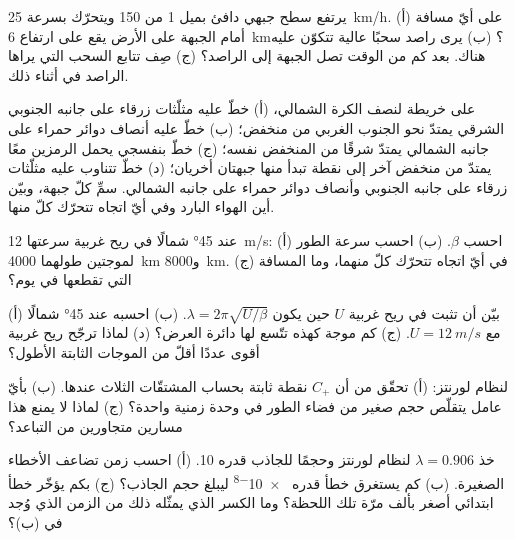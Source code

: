 \begin{exercise}[$\star$]\label{exo:b2:weather-systems:2}
يرتفع سطح جبهي دافئ بميل 1 من 150 ويتحرّك بسرعة \qty{25}{km/h}. (أ) على أيّ مسافة أمام
الجبهة على الأرض يقع  على ارتفاع \qty{6}{km}؟ (ب) يرى راصد سحبًا عالية تتكوّن
عليه هناك. بعد كم من الوقت تصل الجبهة إلى الراصد؟ (ج) صِف تتابع
السحب التي يراها الراصد في أثناء ذلك.
\end{exercise}

\begin{exercise}[$\star$]\label{exo:b2:weather-systems:3}
على خريطة لنصف الكرة الشمالي، (أ) خطّ عليه مثلّثات زرقاء على جانبه الجنوبي الشرقي يمتدّ نحو الجنوب الغربي
من منخفض؛ (ب) خطّ عليه أنصاف دوائر حمراء على جانبه الشمالي يمتدّ شرقًا من المنخفض نفسه؛ (ج)
خطّ بنفسجي يحمل الرمزين معًا يمتدّ من منخفض آخر إلى نقطة تبدأ منها جبهتان أخريان؛
(د) خطّ تتناوب عليه مثلّثات زرقاء على جانبه الجنوبي وأنصاف دوائر حمراء على جانبه الشمالي.
سمِّ كلّ جبهة، وبيّن أين الهواء البارد وفي أيّ اتجاه تتحرّك كلّ منها.
\end{exercise}

\begin{exercise}[$\star$]\label{exo:b2:weather-systems:4}
عند \ang{45} شمالًا في ريح غربية سرعتها \qty{12}{m/s}: (أ) احسب $\beta$. (ب) احسب سرعة الطور
لموجتين طولهما \qty{4000}{km} و\qty{8000}{km}. (ج) في أيّ اتجاه تتحرّك كلّ منهما، وما المسافة التي تقطعها في
يوم؟
\end{exercise}

\begin{exercise}[$\star\star$]\label{exo:b2:weather-systems:5}
(أ) بيّن أن  تثبت في ريح غربية $U$ حين يكون $\lambda = 2\pi\sqrt{U/\beta}$.
(ب) احسبه عند \ang{45} شمالًا مع $U = \qty{12}{m/s}$. (ج) كم موجة كهذه تتّسع لها دائرة
العرض؟ (د) لماذا ترجّح ريح غربية أقوى عددًا أقلّ من الموجات الثابتة الأطول؟
\end{exercise}

\begin{exercise}[$\star\star$]\label{exo:b2:weather-systems:6}
لنظام لورنتز: (أ) تحقّق من أن $C_+$ نقطة ثابتة بحساب المشتقّات الثلاث
عندها. (ب) بأيّ عامل يتقلّص حجم صغير من فضاء الطور في وحدة زمنية واحدة؟ (ج) لماذا
لا يمنع هذا مسارين متجاورين من التباعد؟
\end{exercise}

\begin{exercise}[$\star\star$]\label{exo:b2:weather-systems:7}
خذ $\lambda = 0.906$ لنظام لورنتز وحجمًا للجاذب قدره 10. (أ) احسب
زمن تضاعف الأخطاء الصغيرة. (ب) كم يستغرق خطأ قدره \num{e-8} ليبلغ حجم
الجاذب؟ (ج) بكم يؤخّر خطأ ابتدائي أصغر بألف مرّة تلك اللحظة؟ وما
الكسر الذي يمثّله ذلك من الزمن الذي وُجد في (ب)؟
\end{exercise}

